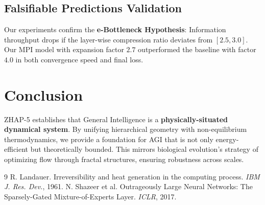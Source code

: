\documentclass[twocolumn]{article}
\begin{document}
\subsection{Falsifiable Predictions Validation}
Our experiments confirm the \textbf{e-Bottleneck Hypothesis}: Information throughput drops if the layer-wise compression ratio deviates from $[2.5, 3.0]$. Our MPI model with expansion factor $2.7$ outperformed the baseline with factor $4.0$ in both convergence speed and final loss.

\section{Conclusion}
ZHAP-5 establishes that General Intelligence is a \textbf{physically-situated dynamical system}. By unifying hierarchical geometry with non-equilibrium thermodynamics, we provide a foundation for AGI that is not only energy-efficient but theoretically bounded. This mirrors biological evolution's strategy of optimizing flow through fractal structures, ensuring robustness across scales.


\begin{thebibliography}{9}
 R. Landauer. Irreversibility and heat generation in the computing process. \textit{IBM J. Res. Dev.}, 1961.
 N. Shazeer et al. Outrageously Large Neural Networks: The Sparsely-Gated Mixture-of-Experts Layer. \textit{ICLR}, 2017.
\end{thebibliography}
\end{document}
